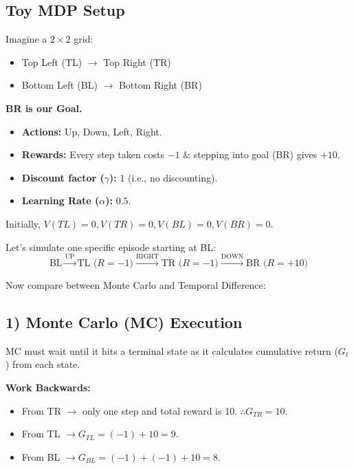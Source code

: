 \documentclass[12pt]{article}
\begin{document}
\subsection*{Toy MDP Setup}
Imagine a $2 \times 2$ grid:
\begin{itemize}[label=$\bullet$]
    \item Top Left (TL) $\rightarrow$ Top Right (TR)
    \item Bottom Left (BL) $\rightarrow$ Bottom Right (BR)
\end{itemize}
\textbf{BR is our Goal.}

\begin{itemize}[label=$\bullet$]
    \item \textbf{Actions:} Up, Down, Left, Right.
    \item \textbf{Rewards:} Every step taken costs $-1$ \& stepping into goal (BR) gives $+10$.
    \item \textbf{Discount factor ($\gamma$):} $1$ (i.e., no discounting).
    \item \textbf{Learning Rate ($\alpha$):} $0.5$.
\end{itemize}

\noindent Initially, $V(TL)=0, V(TR)=0, V(BL)=0, V(BR)=0$.

\vspace{0.3cm}
\noindent Let's simulate one specific episode starting at BL:
$$ \text{BL} \xrightarrow{\text{UP}} \text{TL (} R=-1 \text{)} \xrightarrow{\text{RIGHT}} \text{TR (} R=-1 \text{)} \xrightarrow{\text{DOWN}} \text{BR (} R=+10 \text{)} $$

\noindent Now compare between Monte Carlo and Temporal Difference:

\subsection*{1) Monte Carlo (MC) Execution}
MC must wait until it hits a terminal state as it calculates cumulative return ($G_t$) from each state.

\vspace{0.3cm}
\noindent\textbf{Work Backwards:}
\begin{itemize}[label=$\bullet$]
    \item From TR $\rightarrow$ only one step and total reward is 10. $\therefore G_{TR} = 10$.
    \item From TL $\rightarrow G_{TL} = (-1) + 10 = 9$.
    \item From BL $\rightarrow G_{BL} = (-1) + (-1) + 10 = 8$.
\end{itemize}
\end{document}

